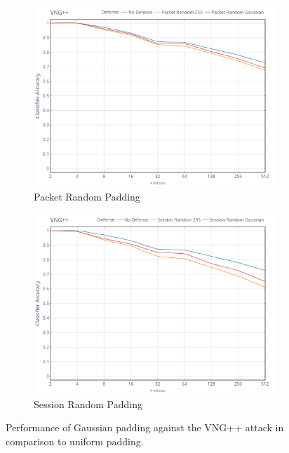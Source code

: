 \documentclass[
	ruledheaders=chapter,
	class=report,
	thesis={type=master, department=inf},
	accentcolor=1c,
	custommargins=true,
	marginpar=false,
	parskip=half-,
	fontsize=11pt,
]{tudapub}
\begin{document}
	\begin{figure}
		\begin{subfigure}{0.495\textwidth}
			\centering
			\includegraphics[width=\textwidth]{plots/performance_vng++_pkt.png}
			\caption{Packet Random Padding}
		\end{subfigure}
		\hfill
		\begin{subfigure}{0.495\textwidth}
			\centering
			\includegraphics[width=\textwidth]{plots/performance_vng++_ses.png}
			\caption{Session Random Padding}
		\end{subfigure}
		\caption[Performance of Gaussian padding against the VNG++ attack]{Performance of Gaussian padding against the VNG++ attack \cite{Dyer2012} in comparison to uniform padding.}
		\label{fig:vng++}
	\end{figure}
\end{document}

